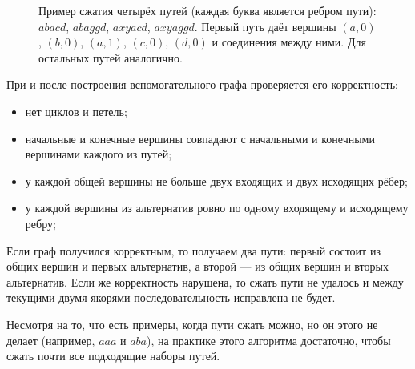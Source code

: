 \documentclass[14pt]{matmex-diploma-custom}
\begin{document}
\begin{figure}[h]
    \centering
{}
\caption{Пример сжатия четырёх путей (каждая буква является ребром пути): $abacd$, $abaggd$, $axyacd$, $axyaggd$. Первый путь даёт вершины $(a,0)$, $(b,0)$, $(a,1)$, $(c,0)$, $(d,0)$ и соединения между ними. Для остальных путей аналогично.}
\label{fig:compresed_paths}
\end{figure}

При и после построения вспомогательного графа проверяется его корректность: 
\begin{itemize}
    \item нет циклов и петель;
    \item начальные и конечные вершины совпадают с начальными и конечными вершинами каждого из путей;
    \item у каждой общей вершины не больше двух входящих и двух исходящих рёбер;
    \item у каждой вершины из альтернатив ровно по одному входящему и исходящему ребру;
\end{itemize}

Если граф получился корректным, то получаем два пути: первый состоит из общих вершин и первых альтернатив, а второй --- из общих вершин и вторых альтернатив. Если же корректность нарушена, то сжать пути не удалось и между текущими двумя якорями последовательность исправлена не будет.

Несмотря на то, что есть примеры, когда пути сжать можно, но он этого не делает (например, $aaa$ и $aba$), на практике этого алгоритма достаточно, чтобы сжать почти все подходящие наборы путей.
\end{document}

